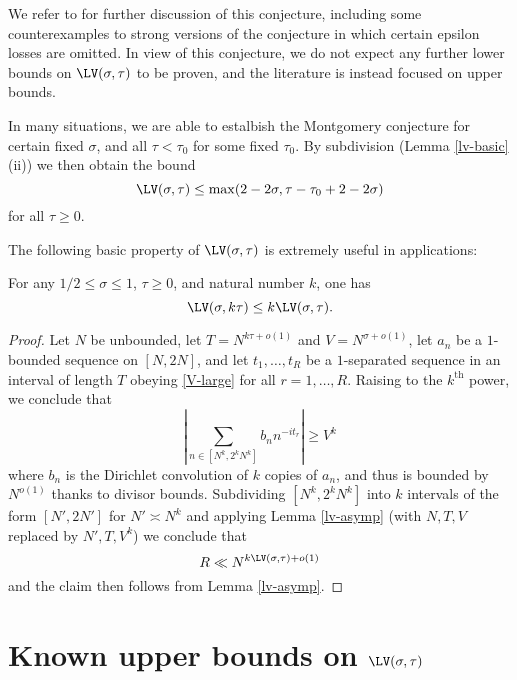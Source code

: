 
We refer to \cite{bourgain_montgomery_1991} for further discussion of this conjecture, including some counterexamples to strong versions of the conjecture in which certain epsilon losses are omitted.  In view of this conjecture, we do not expect any further lower bounds on $\LV(\sigma,\tau)$ to be proven, and the literature is instead focused on upper bounds.

In many situations, we are able to estalbish the Montgomery conjecture for certain fixed $\sigma$, and all $\tau<\tau_0$ for some fixed $\tau_0$.  By subdivision (Lemma \ref{lv-basic}(ii)) we then obtain the bound
\begin{equation}\label{lvt-opt}
    \LV(\sigma, \tau) \leq \max( 2 - 2 \sigma, \tau - \tau_0 + 2 - 2\sigma)
\end{equation}
for all $\tau \geq 0$.


The following basic property of $\LV(\sigma,\tau)$ is extremely useful in applications:

\begin{lemma}\label{power-lemma}  For any $1/2 \leq \sigma \leq 1$, $\tau \geq 0$, and natural number $k$, one has
    $$ \LV(\sigma, k\tau) \leq k \LV(\sigma, \tau).$$
\end{lemma}


\begin{proof}  Let $N$ be unbounded, let $T = N^{k\tau+o(1)}$ and $V = N^{\sigma+o(1)}$, let $a_n$ be a $1$-bounded sequence on $[N,2N]$, and let $t_1,\dots,t_R$ be a $1$-separated sequence in an interval of length $T$ obeying \eqref{V-large}
for all $r=1,\dots,R$.  Raising to the $k^{\mathrm{th}}$ power, we conclude that
$$ \left|\sum_{n \in [N^k,2^kN^k]} b_n n^{-it_r} \right| \geq V^k$$
where $b_n$ is the Dirichlet convolution of $k$ copies of $a_n$, and thus is bounded by $N^{o(1)}$ thanks to divisor bounds.  Subdividing $[N^k, 2^k N^k]$ into $k$ intervals of the form $[N',2N']$ for $N' \asymp N^k$ and applying Lemma \ref{lv-asymp} (with $N, T, V$ replaced by $N', T, V^k$) we conclude that
$$ R \ll N^{k \LV(\sigma,\tau) + o(1)}$$
and the claim then follows from Lemma \ref{lv-asymp}.
\end{proof}

\section{Known upper bounds on \texorpdfstring{$\LV(\sigma,\tau)$}{LV(sigma,tau)}}

